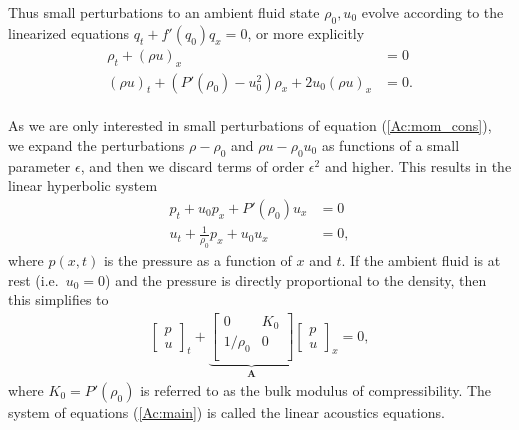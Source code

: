 \documentclass[11pt]{article}
\begin{document}
Thus small perturbations to an ambient fluid state \(\rho_0, u_0\)
evolve according to the linearized equations \(q_t + f'(q_0) q_x = 0\),
or more explicitly \begin{align*}
\rho_t + (\rho u)_x & = 0 \\
(\rho u)_t + (P'(\rho_0)-u_0^2)\rho_x + 2u_0(\rho u)_x & = 0.
\end{align*}\\
As we are only interested in small perturbations of equation
(\ref{Ac:mom_cons}), we expand the perturbations \(\rho-\rho_0\) and
\(\rho u - \rho_0 u_0\) as functions of a small parameter \(\epsilon\),
and then we discard terms of order \(\epsilon^2\) and higher. This
results in the linear hyperbolic system\\
\begin{align*}
p_t + u_0 p_x + P'(\rho_0) u_x & = 0 \\
u_t + \frac{1}{\rho_0} p_x + u_0 u_x & = 0,
\end{align*} where \(p(x,t)\) is the pressure as a function of \(x\) and
\(t\). If the ambient fluid is at rest (i.e.~\(u_0=0\)) and the pressure
is directly proportional to the density, then this simplifies to
\begin{align} \label{Ac:main}
 \left[ \begin{array}{c}
p \\
u 
\end{array} \right]_t +  \underbrace{\left[ \begin{array}{cc}
0 & K_0 \\
1/\rho_0 & 0  \\
\end{array} \right]}_{\mathbf{A}}
\left[ \begin{array}{c}
p \\
u \end{array} \right]_x = 0,
\end{align} where \(K_0=P'(\rho_0)\) is referred to as the bulk modulus
of compressibility. The system of equations (\ref{Ac:main}) is called
the linear acoustics equations.
\end{document}

